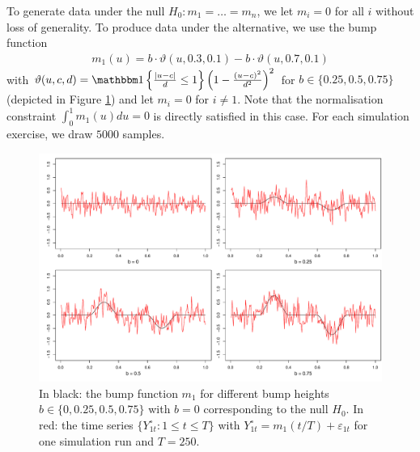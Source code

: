\documentclass[12pt]{article}
\begin{document}
To generate data under the null $H_0: m_1 = \ldots = m_n$, we let $m_i = 0$ for all $i$ without loss of generality. To produce data under the alternative, we use the bump function
\begin{align}
m_1(u) =  b \cdot  \vartheta(u, 0.3, 0.1) - b  \cdot  \vartheta(u,0.7, 0.1)  \label{eq:bump-fct}
\end{align}
with $\vartheta(u,c,d) =  \ind \left\{\frac{|u - c|}{d}\leq 1 \right\} \left(1 - \frac{(u - c)^2}{d^2}\right)^2$ for $b \in \{ 0.25, 0.5, 0.75 \}$ (depicted in Figure \ref{fig:bump_function}) and let $m_i = 0$ for $i \neq 1$. Note that the normalisation constraint $\int_0^1 m_1(u) du = 0$ is directly satisfied in this case. For each simulation exercise, we draw $5000$ samples.


\begin{figure}[t!]
\includegraphics[width=\textwidth]{../output/bump_function.pdf}
\caption{In black: the bump function $m_1$ for different bump heights $b \in \{0, 0.25, 0.5, 0.75\}$ with $b=0$ corresponding to the null $H_0$. In red: the time series $\{Y_{1t}^\circ : 1 \le t \le T \}$ with $Y_{1t}^\circ = m_1(t/T) + \varepsilon_{1t}$ for one simulation run and $T=250$.}\label{fig:bump_function}
\end{figure}
\end{document}
